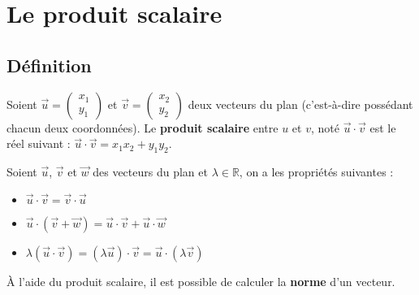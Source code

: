 



	\section{Le produit scalaire}

	\subsection{Définition}
	\label{definition}

	\begin{formula}[Définition]
		Soient $\overrightarrow{u} = \begin{pmatrix} {x_1} \\ {y_1}\end{pmatrix}$ et $\overrightarrow{v} = \begin{pmatrix} {x_2} \\ {y_2}\end{pmatrix}$ deux vecteurs du plan (c'est-à-dire possédant chacun deux coordonnées).
		\newpar
		Le \textbf{produit scalaire} entre $u$ et $v$, noté $\overrightarrow{u} \cdot \overrightarrow{v}$ est le réel suivant :
		\newpar
		$\overrightarrow{u} \cdot \overrightarrow{v} = x_1 x_2 + y_1 y_2$.
	\end{formula}

	\begin{formula}[Propriétés]
		Soient $\overrightarrow{u}$, $\overrightarrow{v}$ et $\overrightarrow{w}$ des vecteurs du plan et $\lambda \in \mathbb{R}$, on a les propriétés suivantes :
		\begin{itemize}
			\item $\overrightarrow{u} \cdot \overrightarrow{v} = \overrightarrow{v} \cdot \overrightarrow{u}$
			\item $\overrightarrow{u} \cdot (\overrightarrow{v} + \overrightarrow{w}) = \overrightarrow{u} \cdot \overrightarrow{v} + \overrightarrow{u} \cdot \overrightarrow{w}$
			\item $\lambda(\overrightarrow{u} \cdot \overrightarrow{v}) = (\lambda \overrightarrow{u}) \cdot \overrightarrow{v} = \overrightarrow{u} \cdot (\lambda \overrightarrow{v})$
		\end{itemize}
	\end{formula}

	À l'aide du produit scalaire, il est possible de calculer la \textbf{norme} d'un vecteur.

